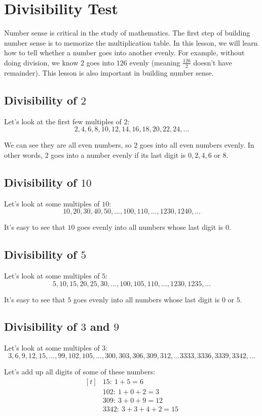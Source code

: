 
\section{Divisibility Test}

Number sense is critical in the study of mathematics. The first step of building number sense is to memorize the multiplication table. In this lesson, we will learn how to tell whether a number goes into another evenly. For example, without doing division, we know $2$ goes into $126$ evenly (meaning $\frac{126}{2}$ doesn't have remainder). This lesson is also important in building number sense.

\subsection{Divisibility of $2$}
Let's look at the first few multiples of $2$:
\[ 2, 4, 6, 8, 10, 12, 14, 16, 18, 20, 22, 24, ... \]

We can see they are all even numbers, so $2$ goes into all even numbers evenly. In other words, $2$ goes into a number evenly if its last digit is $0,2,4,6 \text{ or } 8$.

\subsection{Divisibility of $10$}
Let's look at some multiples of $10$:
\[ 10, 20, 30, 40, 50, ..., 100, 110, ..., 1230, 1240, ... \]

It's easy to see that $10$ goes evenly into all numbers whose last digit is $0$.

\subsection{Divisibility of $5$}
Let's look at some multiples of $5$:
\[ 5, 10, 15, 20, 25, 30, ..., 100, 105, 110, ..., 1230, 1235, ... \]

It's easy to see that $5$ goes evenly into all numbers whose last digit is $0$ or $5$.

\subsection{Divisibility of $3$ and $9$}
Let's look at some multiples of $3$:
\[ 3,6,9,12,15,...,99,102,105,...,300,303,306,309,312,...3333,3336,3339,3342,... \]

Let's add up all digits of some of these numbers:
\[
\begin{aligned}[t]
   &15:\: 1+5=6 \\
   &102:\: 1+0+2=3 \\
   &309:\:3+0+9=12 \\
   &3342:\: 3+3+4+2=15
\end{aligned}
\]

